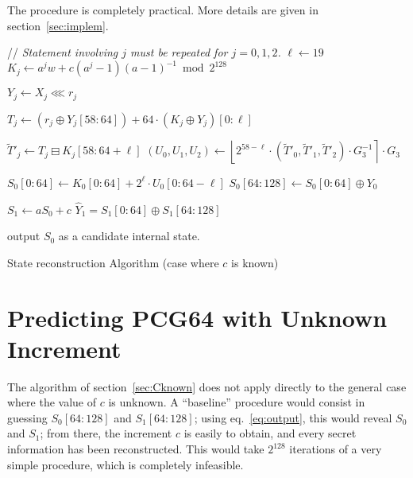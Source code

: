 \documentclass[submission,svgnames,journal=tosc]{iacrtrans}
\begin{document}
The procedure is completely practical. More details are given in section~\ref{sec:implem}.

\begin{algorithm}
\begin{algorithmic}[1]
  \State // \emph{Statement involving $j$ must be repeated for $j=0, 1, 2$.}
  \State $\ell \gets 19$
   
    \State $K_j \gets a^j w + c (a^j - 1)(a-1)^{-1} \bmod 2^{128}$    
    
     
    
    \State $Y_j \gets X_j \lll r_j$ 
    
    \State $T_j \gets \left(r_j \oplus Y_j[58:64]\right) +  64 \cdot \left(K_j \oplus Y_j\right)[0:\ell]$  
    
    \State $\widetilde T'_j \gets T_j \boxminus K_j[58:64+\ell]$  
    \State $(U_0, U_1, U_2) \gets \left\lfloor 2^{58-\ell} \cdot (\widetilde T'_0, \widetilde T'_1, \widetilde T'_2) \cdot  G_3^{-1} \right\rceil \cdot G_3$ 

    \State $S_0[0:64] \gets  K_0[0:64] + 2^{\ell} \cdot U_0[0:64-\ell]$ 
    \State $S_0[64:128] \gets S_0[0:64] \oplus Y_0$ 
    
    \State $S_1 \gets a  S_0 + c$ 
    \State $\widehat{Y}_1 =  S_1[0:64] \oplus  S_1[64:128]$
    
     
    \State output $S_0$ as a candidate internal state.
    \EndIf
    \EndFor
    \EndFor
    \EndProcedure
  \end{algorithmic}
  \caption{State reconstruction Algorithm (case where $c$ is known)}
  \label{algo:known}
\end{algorithm}
  
\section{Predicting PCG64 with Unknown Increment}
\label{sec:Cunknown}

The algorithm of section~\ref{sec:Cknown} does not apply directly to the general
case where the value of $c$ is unknown. A ``baseline'' procedure would consist
in guessing $S_0[64:128]$ and $S_1[64:128]$; using eq.~\eqref{eq:output}, this
would reveal $S_0$ and $S_1$; from there, the increment $c$ is easily to obtain,
and every secret information has been reconstructed. This would take $2^{128}$
iterations of a very simple procedure, which is completely infeasible.
\end{document}
